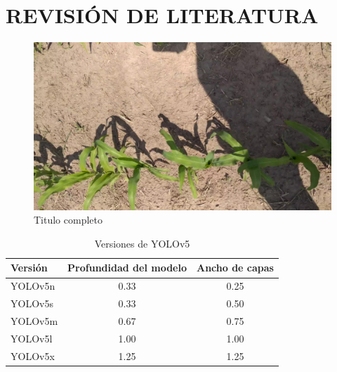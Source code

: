 \chapter{REVISIÓN DE LITERATURA}

\blindmathpaper

\begin{figure}[H] %
	\centering
	\includegraphics[width=1\textwidth]{Imagenes/0001}
	\caption[Titulo de lista]{Titulo completo}
	\label{fig:yolov4-t}
\end{figure}


\begin{table}[H] %
	\caption[Versiones de YOLOv5]{Versiones de YOLOv5} \label{tab:Verv5}
	\centering
	\begin{tabular}{lcc}
		\toprule
		\textbf{Versión} & \textbf{Profundidad del modelo} & \textbf{Ancho de capas}\\
		\midrule
		YOLOv5n & 0.33 & 0.25 \\
		YOLOv5s & 0.33 &  0.50 \\
		YOLOv5m & 0.67 & 0.75 \\
		YOLOv5l & 1.00 & 1.00 \\
		YOLOv5x & 1.25 & 1.25 \\
		\bottomrule
	\end{tabular}
\end{table}